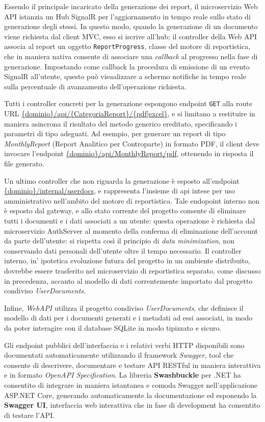 Essendo il principale incaricato della generazione dei report, il microservizio Web API istanzia un Hub SignalR per l'aggiornamento in tempo reale sullo stato di generazione degli stessi. In questo modo, quando la generazione di un documento viene richiesta dal client MVC, esso si iscrive all'hub; il controller della Web API associa al report un oggetto \texttt{ReportProgress}, classe del motore di reportistica, che in maniera nativa consente di associare una \emph{callback} al progresso nella fase di generazione. Impostando come callback la procedura di emissione di un evento SignalR all'utente, questo può visualizzare a schermo notifiche in tempo reale sulla percentuale di avanzamento dell'operazione richiesta.

Tutti i controller concreti per la generazione espongono endpoint \texttt{GET} alla route URL \url{{dominio}/api/{CategoriaReport}/{pdf|excel}}, e si limitano a restituire in maniera asincrona il risultato del metodo generico ereditato, specificando i parametri di tipo adeguati. Ad esempio, per generare un report di tipo \emph{MonthlyReport} (Report Analitico per Controparte) in formato PDF, il client deve invocare l'endpoint \url{{dominio}/api/MonthlyReport/pdf}, ottenendo in risposta il file generato.

Un ultimo controller che non riguarda la generazione è esposto all'endpoint \url{{dominio}/internal/userdocs}, e rappresenta l'insieme di api intese per uso amministrativo nell'ambito del motore di reportistica. Tale endopoint interno non è esposto dal gateway, e allo stato corrente del progetto consente di eliminare tutti i documenti e i dati associati a un utente: questa operazione è richiesta dal microservizio AuthServer al momento della conferma di eliminazione dell'account da parte dell'utente: si rispetta così il principio di \emph{data minimization}, non conservando dati personali dell'utente oltre il tempo necessario.
Il controller interno, in' ipotetica evoluzione futura del progetto in un ambiente distribuito, dovrebbe essere trasferito nel microservizio di reportistica separato, come discusso in precedenza, accanto al modello di dati correntemente importato dal progetto condiviso \emph{UserDocuments}.

Infine, \emph{WebAPI} utilizza il progetto condiviso \emph{UserDocuments}, che definisce il modello di dati per i documenti generati e i metadati ad essi associati, in modo da poter interagire con il database SQLite in modo tipizzato e sicuro.

Gli endpoint pubblici dell'interfaccia e i relativi verbi HTTP disponibili sono documentati automaticamente utilizzando il framework \emph{Swagger}, tool che consente di descrivere, documentare e testare API RESTful in maniera interattiva e in formato \emph{OpenAPI Specification}. La libreria \textbf{Swashbuckle} per .NET ha consentito di integrare in maniera istantanea e comoda Swagger nell'applicazione ASP.NET Core, generando automaticamente la documentazione ed esponendo la \textbf{Swagger UI}, interfaccia web interattiva che in fase di development ha consentito di testare l'API.

